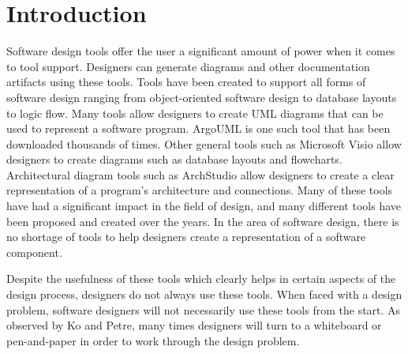 \chapter{Introduction}

Software design tools offer the user a significant amount of power when it comes to tool support. 
Designers can generate diagrams and other documentation artifacts using these tools.
Tools have been created to support all forms of software design ranging from object-oriented software design to database layouts to logic flow.
Many tools allow designers to create UML diagrams that can be used to represent a software program. ArgoUML\cite{argouml} is one such tool that has been downloaded thousands of times.
Other general tools such as Microsoft Visio\cite{visio} allow designers to create diagrams such as database layouts and flowcharts. 
Architectural diagram tools such as ArchStudio\cite{archstudio} allow designers to create a clear representation of a program's architecture and connections.
Many of these tools have had a significant impact in the field of design, and many different tools have been proposed and created over the years.
In the area of software design, there is no shortage of tools to help designers create a representation of a software component.

Despite the usefulness of these tools which clearly helps in certain aspects of the design process, designers do not always use these tools.
When faced with a design problem, software designers will not necessarily use these tools from the start. 
As observed by Ko\cite{andy_ko} and Petre\cite{petre}, many times designers will turn to a whiteboard or pen-and-paper in order to work through the design problem.


